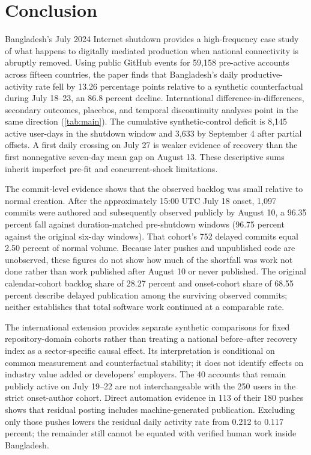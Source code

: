 \section{Conclusion}
\label{sec:conclusion}

Bangladesh's July 2024 Internet shutdown provides a high-frequency case study of what happens to digitally mediated production when national connectivity is abruptly removed. Using public GitHub events for 59,158 pre-active accounts across fifteen countries, the paper finds that Bangladesh's daily productive-activity rate fell by 13.26 percentage points relative to a synthetic counterfactual during July 18--23, an 86.8 percent decline. International difference-in-differences, secondary outcomes, placebos, and temporal discontinuity analyses point in the same direction (\cref{tab:main}). The cumulative synthetic-control deficit is 8,145 active user-days in the shutdown window and 3,633 by September 4 after partial offsets. A first daily crossing on July 27 is weaker evidence of recovery than the first nonnegative seven-day mean gap on August 13. These descriptive sums inherit imperfect pre-fit and concurrent-shock limitations.

The commit-level evidence shows that the observed backlog was small relative to normal creation. After the approximately 15:00 UTC July 18 onset, 1,097 commits were authored and subsequently observed publicly by August 10, a 96.35 percent fall against duration-matched pre-shutdown windows (96.75 percent against the original six-day windows). That cohort's 752 delayed commits equal 2.50 percent of normal volume. Because later pushes and unpublished code are unobserved, these figures do not show how much of the shortfall was work not done rather than work published after August 10 or never published. The original calendar-cohort backlog share of 28.27 percent and onset-cohort share of 68.55 percent describe delayed publication among the surviving observed commits; neither establishes that total software work continued at a comparable rate.

The international extension provides separate synthetic comparisons for fixed repository-domain cohorts rather than treating a national before--after recovery index as a sector-specific causal effect. Its interpretation is conditional on common measurement and counterfactual stability; it does not identify effects on industry value added or developers' employers. The 40 accounts that remain publicly active on July 19--22 are not interchangeable with the 250 users in the strict onset-author cohort. Direct automation evidence in 113 of their 180 pushes shows that residual posting includes machine-generated publication. Excluding only those pushes lowers the residual daily activity rate from 0.212 to 0.117 percent; the remainder still cannot be equated with verified human work inside Bangladesh.

